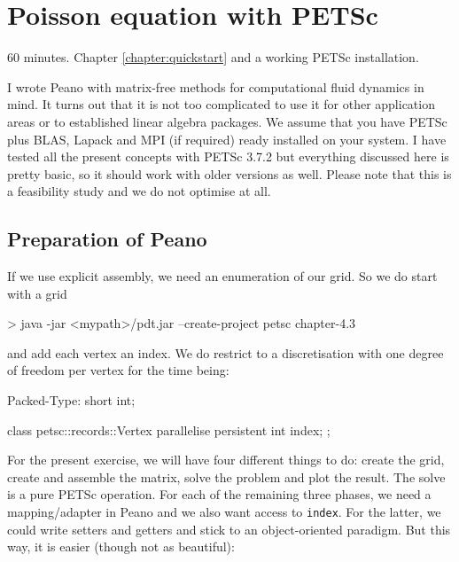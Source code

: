 \section{Poisson equation with PETSc}
  \label{section:applications:petsc}

\chapterDescription
  {
    60 minutes.
  }
  {
    Chapter \ref{chapter:quickstart} and a working PETSc installation.
  }

I wrote Peano with matrix-free methods for computational fluid dynamics in mind. 
It turns out that it is not too complicated to use it for other application
areas or to established linear algebra packages.
We assume that you have PETSc plus BLAS, Lapack and MPI (if required) ready
installed on your system.
I have tested all the present concepts with PETSc 3.7.2 but everything discussed
here is pretty basic, so it should work with older versions as well.
Please note that this is a feasibility study and we do not optimise at all.


\subsection{Preparation of Peano}

If we use explicit assembly, we need an enumeration of our grid. 
So we do start with a grid
\begin{code}
> java -jar <mypath>/pdt.jar --create-project petsc chapter-4.3
\end{code}

\noindent
and add each vertex an index. 
We do restrict to a discretisation with one degree of freedom per vertex for the
time being:

\begin{code}
Packed-Type: short int;

class petsc::records::Vertex {  
  parallelise persistent int index;
};
\end{code}

\noindent
For the present exercise, we will have four different things to do:
create the grid, create and assemble the matrix, solve the problem and plot the
result.
The solve is a pure PETSc operation.
For each of the remaining three phases, we need a mapping/adapter in Peano and
we also want access to \texttt{index}.
For the latter, we could write setters and getters and stick to an
object-oriented paradigm.
But this way, it is easier (though not as beautiful):


